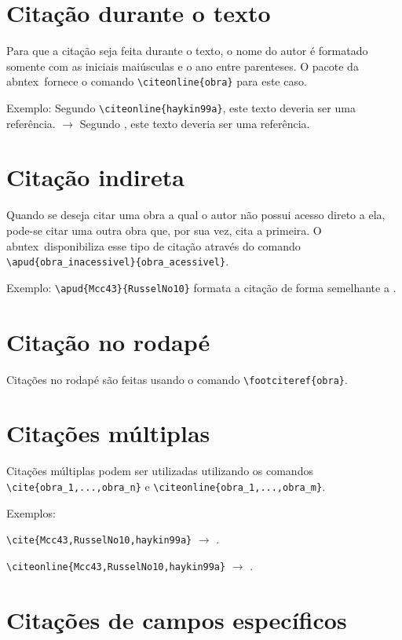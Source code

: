 \documentclass{fei}
\begin{document}
    \section{Citação durante o texto}
    Para que a citação seja feita durante o texto, o nome do autor é formatado somente com as iniciais maiúsculas e o ano entre parenteses. O pacote da \gls{abntex}~fornece o comando \verb+\citeonline{obra}+ para este caso.

    Exemplo: Segundo \verb+\citeonline{haykin99a}+, este texto deveria ser uma referência. $\to$ Segundo , este texto deveria ser uma referência.
	
	\section{Citação indireta}
	Quando se deseja citar uma obra a qual o autor não possui acesso direto a ela, pode-se citar uma outra obra que, por sua vez, cita a primeira. O \gls{abntex}~disponibiliza esse tipo de citação através do comando \verb+\apud{obra_inacessivel}{obra_acessivel}+.
	
	Exemplo: \verb++ formata a citação de forma semelhante a \apud{Mcc43}{RusselNo10}.
	
	\section{Citação no rodapé}
	
	Citações no rodapé são feitas usando o comando \verb+\footciteref{obra}+.
	
	\section{Citações múltiplas}
	
	Citações múltiplas podem ser utilizadas utilizando os comandos \verb+\cite{obra_1,...,obra_n}+ e \verb+\citeonline{obra_1,...,obra_m}+.
	
	Exemplos: 
	
	\verb+\cite{Mcc43,RusselNo10,haykin99a}+ \(\to\) \cite{Mcc43,RusselNo10,haykin99a}.
	
	\verb++ \(\to\) \citeonline{Mcc43,RusselNo10,haykin99a}.
	
	\section{Citações de campos específicos}
	
\end{document}
